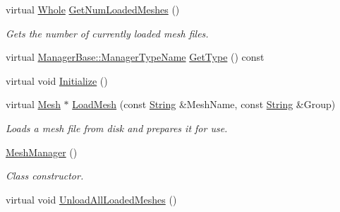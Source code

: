 \begin{DoxyCompactItemize}
virtual \hyperlink{namespaceMezzanine_adcbb6ce6d1eb4379d109e51171e2e493}{Whole} \hyperlink{classMezzanine_1_1MeshManager_a809d8b615341e55c3ed463b1e18c01db}{GetNumLoadedMeshes} ()
\begin{DoxyCompactList}\small\item\em Gets the number of currently loaded mesh files. \item\end{DoxyCompactList}\item 
virtual \hyperlink{classMezzanine_1_1ManagerBase_a08cecf5169cad3e82be81a3a159b0b6e}{ManagerBase::ManagerTypeName} \hyperlink{classMezzanine_1_1MeshManager_a120881dcf7bce1d3a30bedb426650c0e}{GetType} () const 
\item 
virtual void \hyperlink{classMezzanine_1_1MeshManager_ac03c91bea88144bcfa420411bc85f0c7}{Initialize} ()
\item 
virtual \hyperlink{classMezzanine_1_1Mesh}{Mesh} $\ast$ \hyperlink{classMezzanine_1_1MeshManager_a01fcda6b9f1363e99b6ac61e4afcb951}{LoadMesh} (const \hyperlink{namespaceMezzanine_acf9fcc130e6ebf08e3d8491aebcf1c86}{String} \&MeshName, const \hyperlink{namespaceMezzanine_acf9fcc130e6ebf08e3d8491aebcf1c86}{String} \&Group)
\begin{DoxyCompactList}\small\item\em Loads a mesh file from disk and prepares it for use. \item\end{DoxyCompactList}\item 
\hypertarget{classMezzanine_1_1MeshManager_a6ef158bb2f5d96676df284ab1500f170}{
\hyperlink{classMezzanine_1_1MeshManager_a6ef158bb2f5d96676df284ab1500f170}{MeshManager} ()}
\label{classMezzanine_1_1MeshManager_a6ef158bb2f5d96676df284ab1500f170}

\begin{DoxyCompactList}\small\item\em Class constructor. \item\end{DoxyCompactList}\item 
\hypertarget{classMezzanine_1_1MeshManager_a95b66f15b74a8eb4f8cdfab411de6289}{
virtual void \hyperlink{classMezzanine_1_1MeshManager_a95b66f15b74a8eb4f8cdfab411de6289}{UnloadAllLoadedMeshes} ()}
\label{classMezzanine_1_1MeshManager_a95b66f15b74a8eb4f8cdfab411de6289}


\end{DoxyCompactItemize}
